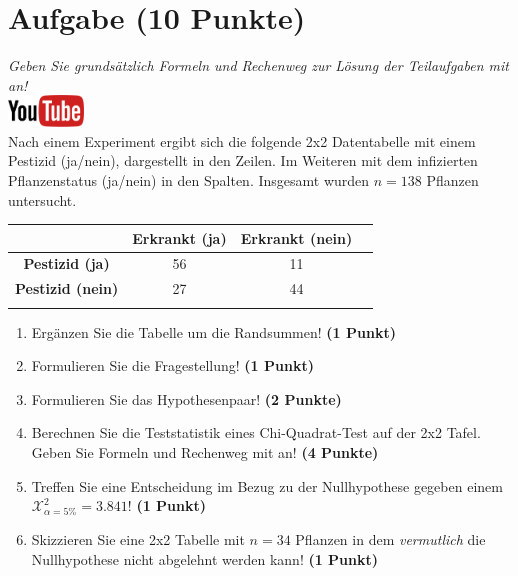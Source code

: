 \documentclass[a4paper, 10pt]{scrartcl}\usepackage[]{graphicx}\usepackage[]{xcolor}
\begin{document}
\section{Aufgabe \hfill (10 Punkte)}

\textit{Geben Sie grunds{\"a}tzlich Formeln und Rechenweg zur L{\"o}sung der
  Teilaufgaben mit an!} \\[1Ex]

\hfill\href{https://youtu.be/PVUK0zdkZkk}{\includegraphics[width =
  2cm]{img/youtube}}\\[1Ex]




Nach einem Experiment ergibt sich die folgende 2x2 Datentabelle mit einem
Pestizid (ja/nein), dargestellt in den Zeilen. Im Weiteren mit dem
infizierten Pflanzenstatus (ja/nein) in den Spalten. Insgesamt wurden
$n = 138$ Pflanzen untersucht.
\vspace{5Ex}

\begin{center}
  \Large
  \begin{tabular}{c|c|c|c}
     & \textbf{Erkrankt (ja)} & \textbf{Erkrankt (nein)} &  \strut\\
    \hline
    \textbf{Pestizid (ja)} & 56  & 11  &     \strut\\
    \hline
    \textbf{Pestizid (nein)} & 27  & 44  &      \strut\\
    \hline
     \phantom{100} & \phantom{100}  & \phantom{100}  &  \phantom{100}  \strut\\
  \end{tabular}
\end{center}

\vspace{5Ex}

\begin{enumerate}
\item Erg{\"a}nzen Sie die Tabelle um die Randsummen! \textbf{(1 Punkt)} 
\item Formulieren Sie die Fragestellung! \textbf{(1 Punkt)}
\item Formulieren Sie das Hypothesenpaar! \textbf{(2 Punkte)}
\item Berechnen Sie die Teststatistik eines Chi-Quadrat-Test auf der 2x2
  Tafel. Geben Sie Formeln und Rechenweg mit an! \textbf{(4 Punkte)}
\item Treffen Sie eine Entscheidung im Bezug zu der Nullhypothese gegeben
  einem $\mathcal{X}^2_{\alpha = 5\%} = 3.841$! \textbf{(1 Punkt)}
\item Skizzieren Sie eine 2x2 Tabelle mit
  $n = 34$ Pflanzen in dem \textit{vermutlich}
  die Nullhypothese nicht abgelehnt werden kann! \textbf{(1 Punkt)}
\end{enumerate} 
\clearpage
\end{document}
